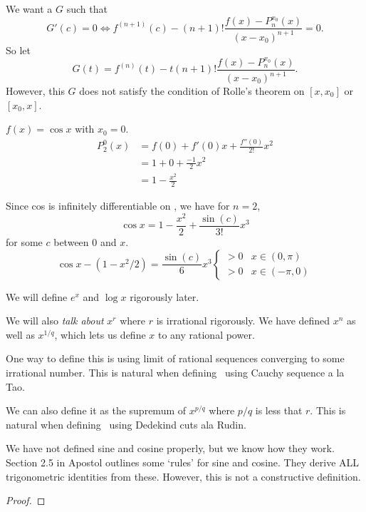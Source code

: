 We want a $G$ such that \[
    G'(c) = 0 \iff f^{(n+1)}(c) - (n+1)! \frac{f(x) - P_{n}^{x_{0}}(x)}{(x - x_{0})^{n+1}} = 0.
\] So let \[
    G(t) = f^{(n)}(t) - t (n+1)! \frac{f(x) - P_{n}^{x_{0}}(x)}{(x - x_{0})^{n+1}}.
\] However, this $G$ does not satisfy the condition of Rolle's theorem on $[x, x_{0}]$ or $[x_{0}, x]$.

\begin{example}
    $f(x) = \cos x$ with $x_{0} = 0$.
    \begin{align*}
        P_{2}^{0}(x) &= f(0) + f'(0) x + \frac{f''(0)}{2!} x^{2} \\
        &= 1 + 0 + \frac{-1}{2} x^{2} \\
        &= 1 - \frac{x^{2}}{2}
    \end{align*}

    Since cos is infinitely differentiable on \R, we have for $n = 2$, \[
        \cos x = 1 - \frac{x^{2}}{2} + \frac{\sin(c)}{3!} x^{3}
    \] for some $c$ between 0 and $x$. \[
        \cos x - (1 - x^{2}/2) = \frac{\sin(c)}{6} x^{3} \begin{cases}
            > 0 & x \in (0, \pi) \\
            > 0 & x \in (-\pi, 0)
        \end{cases}
    \]
\end{example}
\begin{rem}
    We will define $e^{x}$ and $\log x$ rigorously later.
\end{rem}
\begin{rem}
    We will also \emph{talk about} $x^{r}$ where $r$ is irrational rigorously.
    We have defined $x^{n}$ as well as $x^{1/q}$, which lets us define $x$ to any rational power.

    One way to define this is using limit of rational sequences converging to some irrational number. This is natural when defining \R\ using Cauchy sequence a la Tao.

    We can also define it as the supremum of $x^{p/q}$ where $p/q$ is less that $r$. This is natural when defining \R\ using Dedekind cuts ala Rudin.
\end{rem}
\begin{rem}
    We have not defined sine and cosine properly, but we know how they work. Section 2.5 in Apostol outlines some `rules' for sine and cosine. They derive ALL trigonometric identities from these. However, this is not a constructive definition.
\end{rem}
\begin{proof}
     
\end{proof}




